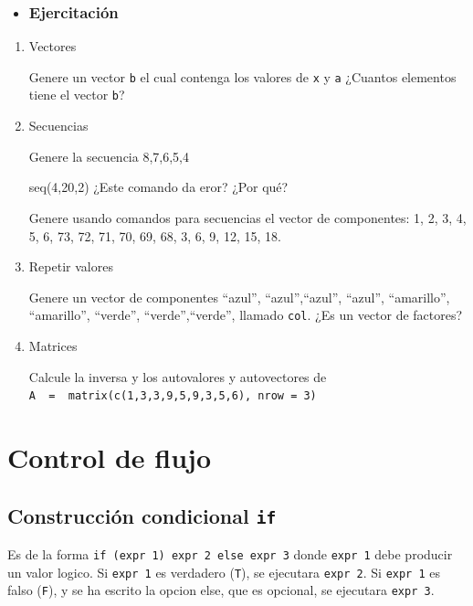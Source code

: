 \documentclass[
]{book}
\newenvironment{rmdblock}[1]
{\begin{shaded*}
		\begin{itemize}
			\renewcommand{\labelitemi}{
				\raisebox{-.7\height}[0pt][0pt]{
					{\setkeys{Gin}{width=3em,keepaspectratio}\texttt{[image: images/\#1]}}
				}
			}
			\item
		}
		{
		\end{itemize}
	\end{shaded*}
}
\newenvironment{rmdtip}
{\begin{rmdblock}{tip}}
	{\end{rmdblock}}
\begin{document}
\begin{rmdtip}
\hypertarget{ejercicio-objetos}{%
\subsection{Ejercitación}\label{ejercicio-objetos}}
\end{rmdtip}

\begin{enumerate}
\def\labelenumi{\arabic{enumi}.}
\item
  Vectores

  Genere un vector \texttt{b} el cual contenga los valores de \texttt{x} y \texttt{a} ¿Cuantos elementos tiene el vector \texttt{b}?
\item
  Secuencias

  Genere la secuencia 8,7,6,5,4

  seq(4,20,2) ¿Este comando da eror? ¿Por qué?

  Genere usando comandos para secuencias el vector de componentes: 1, 2, 3, 4, 5, 6, 73, 72, 71, 70, 69, 68, 3, 6, 9, 12, 15, 18.
\item
  Repetir valores

  Genere un vector de componentes ``azul'', ``azul'',``azul'', ``azul'', ``amarillo'', ``amarillo'', ``verde'', ``verde'',``verde'', llamado \texttt{col}. ¿Es un vector de factores?
\item
  Matrices

  Calcule la inversa y los autovalores y autovectores de \texttt{A\ \ =\ \ matrix(c(1,3,3,9,5,9,3,5,6),\ nrow\ =\ 3)}
\end{enumerate}

\hypertarget{control-de-flujo}{%
\chapter{Control de flujo}\label{control-de-flujo}}

\hypertarget{construcciuxf3n-condicional-if}{%
\section{\texorpdfstring{Construcción condicional \texttt{if}}{Construcción condicional if}}\label{construcciuxf3n-condicional-if}}

Es de la forma \texttt{if\ (expr\ 1)\ expr\ 2\ else\ expr\ 3} donde \texttt{expr\ 1} debe producir un valor logico. Si \texttt{expr\ 1} es verdadero (\texttt{T}), se ejecutara \texttt{expr\ 2}. Si \texttt{expr\ 1} es falso (\texttt{F}), y se ha escrito la opcion else, que es opcional, se ejecutara \texttt{expr\ 3}.
\end{document}
